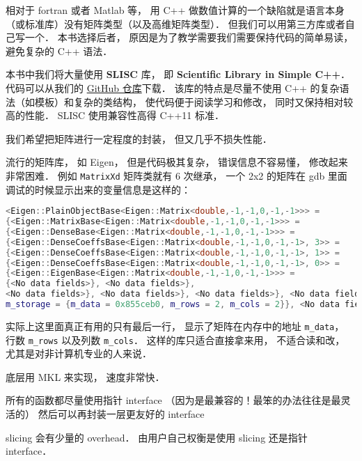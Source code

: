 
\begin{issues}
\issueDraft
\end{issues}

相对于 fortran 或者 Matlab 等， 用 C++ 做数值计算的一个缺陷就是语言本身（或标准库）没有矩阵类型（以及高维矩阵类型）． 但我们可以用第三方库或者自己写一个． 本书选择后者， 原因是为了教学需要我们需要保持代码的简单易读， 避免复杂的 C++ 语法．

本书中我们将大量使用 \textbf{SLISC} 库， 即 \textbf{Scientific Library in Simple C++}． 代码可以从我们的 \href{https://github.com/MacroUniverse/SLISC0}{GitHub 仓库}下载． 该库的特点是尽量不使用 C++ 的复杂语法（如模板）和复杂的类结构， 使代码便于阅读学习和修改， 同时又保持相对较高的性能． SLISC 使用兼容性高得 C++11 标准．

我们希望把矩阵进行一定程度的封装， 但又几乎不损失性能．

流行的矩阵库， 如 Eigen， 但是代码极其复杂， 错误信息不容易懂， 修改起来非常困难． 例如 \verb|MatrixXd| 矩阵类就有 6 次继承， 一个 2x2 的矩阵在 gdb 里面调试的时候显示出来的变量信息是这样的：
\begin{lstlisting}[language=cpp]
<Eigen::PlainObjectBase<Eigen::Matrix<double,-1,-1,0,-1,-1>>> = 
{<Eigen::MatrixBase<Eigen::Matrix<double,-1,-1,0,-1,-1>>> = 
{<Eigen::DenseBase<Eigen::Matrix<double,-1,-1,0,-1,-1>>> = 
{<Eigen::DenseCoeffsBase<Eigen::Matrix<double,-1,-1,0,-1,-1>, 3>> = 
{<Eigen::DenseCoeffsBase<Eigen::Matrix<double,-1,-1,0,-1,-1>, 1>> = 
{<Eigen::DenseCoeffsBase<Eigen::Matrix<double,-1,-1,0,-1,-1>, 0>> = 
{<Eigen::EigenBase<Eigen::Matrix<double,-1,-1,0,-1,-1>>> =
{<No data fields>}, <No data fields>}, 
<No data fields>}, <No data fields>}, <No data fields>}, <No data fields>},
m_storage = {m_data = 0x855ceb0, m_rows = 2, m_cols = 2}}, <No data fields>
\end{lstlisting}
实际上这里面真正有用的只有最后一行， 显示了矩阵在内存中的地址 \verb|m_data|， 行数 \verb|m_rows| 以及列数 \verb|m_cols|． 这样的库只适合直接拿来用， 不适合读和改， 尤其是对非计算机专业的人来说．


底层用 MKL 来实现， 速度非常快．

所有的函数都尽量使用指针 interface （因为是最兼容的！最笨的办法往往是最灵活的） 然后可以再封装一层更友好的 interface

slicing 会有少量的 overhead． 由用户自己权衡是使用 slicing 还是指针 interface．

